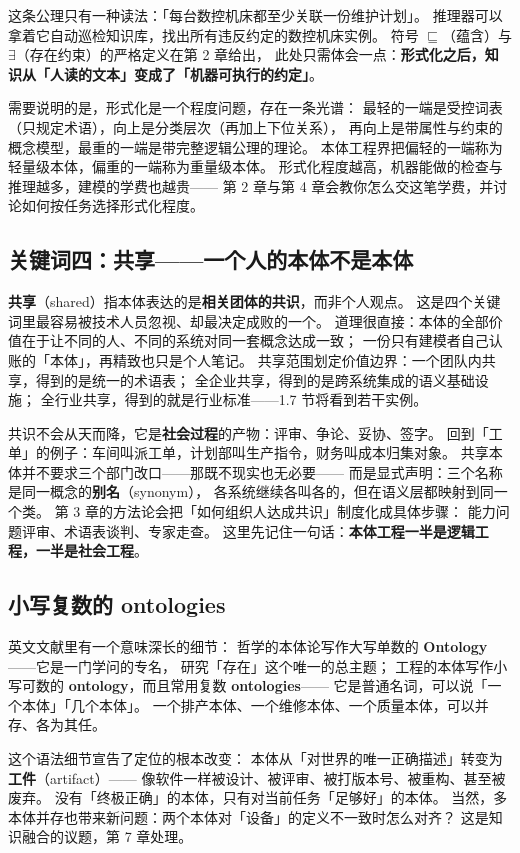 这条公理只有一种读法：「每台数控机床都至少关联一份维护计划」。
推理器可以拿着它自动巡检知识库，找出所有违反约定的数控机床实例。
符号 \(\sqsubseteq\)（蕴含）与 \(\exists\)（存在约束）的严格定义在第 2 章给出，
此处只需体会一点：\textbf{形式化之后，知识从「人读的文本」变成了「机器可执行的约定」}。

需要说明的是，形式化是一个程度问题，存在一条光谱：
最轻的一端是受控词表（只规定术语），向上是分类层次（再加上下位关系），
再向上是带属性与约束的概念模型，最重的一端是带完整逻辑公理的理论。
本体工程界把偏轻的一端称为轻量级本体，偏重的一端称为重量级本体。
形式化程度越高，机器能做的检查与推理越多，建模的学费也越贵——
第 2 章与第 4 章会教你怎么交这笔学费，并讨论如何按任务选择形式化程度。

\subsection{关键词四：共享——一个人的本体不是本体}

\textbf{共享}（shared）指本体表达的是\textbf{相关团体的共识}，而非个人观点。
这是四个关键词里最容易被技术人员忽视、却最决定成败的一个。
道理很直接：本体的全部价值在于让不同的人、不同的系统对同一套概念达成一致；
一份只有建模者自己认账的「本体」，再精致也只是个人笔记。
共享范围划定价值边界：一个团队内共享，得到的是统一的术语表；
全企业共享，得到的是跨系统集成的语义基础设施；
全行业共享，得到的就是行业标准——1.7 节将看到若干实例。

共识不会从天而降，它是\textbf{社会过程}的产物：评审、争论、妥协、签字。
回到「工单」的例子：车间叫派工单，计划部叫生产指令，财务叫成本归集对象。
共享本体并不要求三个部门改口——那既不现实也无必要——
而是显式声明：三个名称是同一概念的\textbf{别名}（synonym），
各系统继续各叫各的，但在语义层都映射到同一个类。
第 3 章的方法论会把「如何组织人达成共识」制度化成具体步骤：
能力问题评审、术语表谈判、专家走查。
这里先记住一句话：\textbf{本体工程一半是逻辑工程，一半是社会工程}。

\subsection{小写复数的 ontologies}

英文文献里有一个意味深长的细节：
哲学的本体论写作大写单数的 \textbf{Ontology}——它是一门学问的专名，
研究「存在」这个唯一的总主题；
工程的本体写作小写可数的 \textbf{ontology}，而且常用复数 \textbf{ontologies}——
它是普通名词，可以说「一个本体」「几个本体」。
一个排产本体、一个维修本体、一个质量本体，可以并存、各为其任。

这个语法细节宣告了定位的根本改变：
本体从「对世界的唯一正确描述」转变为\textbf{工件}（artifact）——
像软件一样被设计、被评审、被打版本号、被重构、甚至被废弃。
没有「终极正确」的本体，只有对当前任务「足够好」的本体。
当然，多本体并存也带来新问题：两个本体对「设备」的定义不一致时怎么对齐？
这是知识融合的议题，第 7 章处理。

